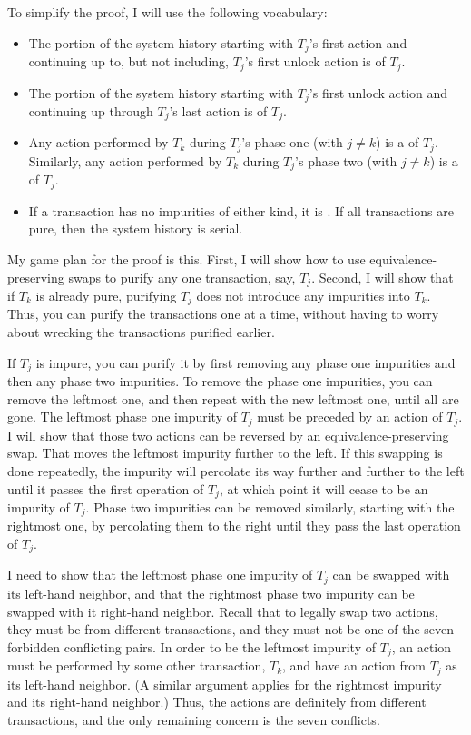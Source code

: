 To simplify the proof, I will use the following
vocabulary:
\begin{itemize}
\item
The portion of the system history starting with $T_j$'s first action
and continuing up to, but not including, $T_j$'s first unlock action
is \label{phase-one-definition} of $T_j$.
\item
The portion of the system history starting with $T_j$'s first unlock
action and continuing up through $T_j$'s last action is  of $T_j$.
\item
Any action performed by $T_k$ during $T_j$'s phase one (with $j \neq
k$) is a  of $T_j$.  Similarly, any
action performed by $T_k$ during $T_j$'s phase two (with $j \neq k$)
is a  of $T_j$.
\item
If a transaction has no impurities of either kind, it is
.  If all transactions are pure, then the system history
is serial.
\end{itemize}

My game plan for the proof is this.  First, I will show how to use
equivalence-preserving swaps to purify any one transaction, say, $T_j$.
Second, I will show that if $T_k$ is already pure, purifying $T_j$
does not introduce any impurities into $T_k$.  Thus, you can
purify the transactions one at a time, without having to worry about
wrecking the transactions purified earlier.

If $T_j$ is impure, you can purify it by first removing any phase one
impurities and then any phase two impurities.  To remove the phase
one impurities, you can remove the leftmost one, and then repeat with
the new leftmost one, until all are gone.  The leftmost phase one
impurity of $T_j$ must be preceded by an action of $T_j$.  I will
show that those two actions can be reversed by an
equivalence-preserving swap.  That moves the leftmost impurity
further to the left.  If this swapping is done repeatedly, the
impurity will percolate its way further and further to the left until
it passes the first operation of $T_j$, at which point it will cease
to be an impurity of $T_j$.  Phase two impurities can be removed
similarly, starting with the rightmost one, by percolating them to the
right until they pass the last operation of $T_j$.

I need to show that the leftmost phase one impurity of $T_j$ can be
swapped with its left-hand neighbor, and that the rightmost phase two
impurity can be swapped with it right-hand neighbor.  Recall that to
legally swap two actions, they must be from different transactions,
and they must not be one of the seven forbidden conflicting pairs.  In
order to be the leftmost impurity of $T_j$, an action must be
performed by some other transaction, $T_k$, and have an action from
$T_j$ as its left-hand neighbor.  (A similar argument applies for the rightmost
impurity and its right-hand neighbor.)  Thus, the actions are
definitely from different transactions, and the only remaining concern is
the seven conflicts.

